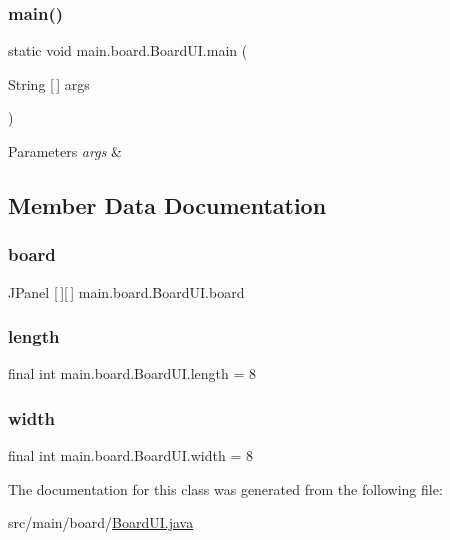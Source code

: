 \subsubsection{\texorpdfstring{main()}{main()}}
{\footnotesize\ttfamily static void main.\+board.\+Board\+U\+I.\+main (\begin{DoxyParamCaption}\item[{String \mbox{[}$\,$\mbox{]}}]{args }\end{DoxyParamCaption})\hspace{0.3cm}{\ttfamily [static]}}


\begin{DoxyParams}{Parameters}
{\em args} & \\
\hline
\end{DoxyParams}


\subsection{Member Data Documentation}
\hypertarget{classmain_1_1board_1_1_board_u_i_aa0e5711381d8309b3dbd16b5bd74a87b}{}\label{classmain_1_1board_1_1_board_u_i_aa0e5711381d8309b3dbd16b5bd74a87b} 
\subsubsection{\texorpdfstring{board}{board}}
{\footnotesize\ttfamily J\+Panel \mbox{[}$\,$\mbox{]}\mbox{[}$\,$\mbox{]} main.\+board.\+Board\+U\+I.\+board}

\hypertarget{classmain_1_1board_1_1_board_u_i_af55bf92762657b51feff3560064e0fa4}{}\label{classmain_1_1board_1_1_board_u_i_af55bf92762657b51feff3560064e0fa4} 
\subsubsection{\texorpdfstring{length}{length}}
{\footnotesize\ttfamily final int main.\+board.\+Board\+U\+I.\+length = 8}

\hypertarget{classmain_1_1board_1_1_board_u_i_a0b6bd608302c1ae92fbb62cfb58f7821}{}\label{classmain_1_1board_1_1_board_u_i_a0b6bd608302c1ae92fbb62cfb58f7821} 
\subsubsection{\texorpdfstring{width}{width}}
{\footnotesize\ttfamily final int main.\+board.\+Board\+U\+I.\+width = 8}



The documentation for this class was generated from the following file\+:\begin{DoxyCompactItemize}
\item 
src/main/board/\hyperlink{_board_u_i_8java}{Board\+U\+I.\+java}\end{DoxyCompactItemize}
